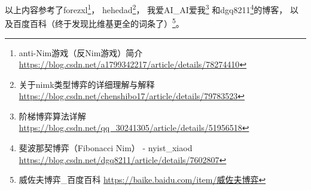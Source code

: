 以上内容参考了forezxl\footnote{anti-Nim游戏（反Nim游戏）简介
	\url{https://blog.csdn.net/a1799342217/article/details/78274410}}，
hehedad\footnote{关于nimk类型博弈的详细理解与解释
	\url{https://blog.csdn.net/chenshibo17/article/details/79783523}}，
我爱AI\_AI爱我\footnote{阶梯博弈算法详解
	\url{https://blog.csdn.net/qq\_30241305/article/details/51956518}}
和dgq8211\footnote{
	斐波那契博弈（Fibonacci Nim） - nyist\_xiaod
	\url{https://blog.csdn.net/dgq8211/article/details/7602807}
}的博客，
以及百度百科（终于发现比维基更全的词条了）\footnote{
	威佐夫博弈\_百度百科
	\url{https://baike.baidu.com/item/威佐夫博弈}
}。
